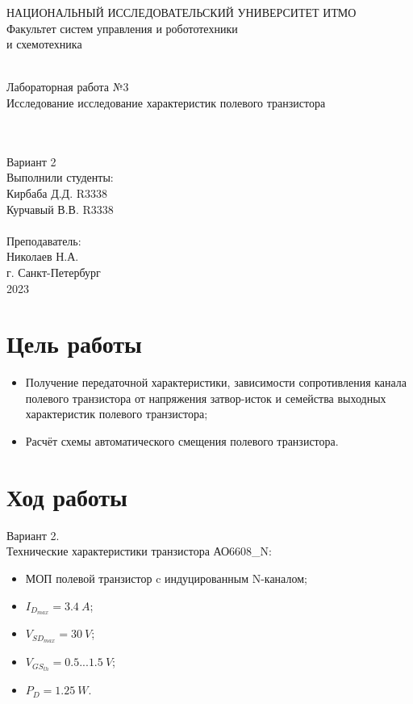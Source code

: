 \documentclass[12pt]{article}
\begin{document}
\begin{titlepage}
\begin{center}
    {\small НАЦИОНАЛЬНЫЙ ИССЛЕДОВАТЕЛЬСКИЙ УНИВЕРСИТЕТ ИТМО} \\
    {\small Факультет систем управления и робототехники} \\
    \vspace*{10\baselineskip}
    { и схемотехника} \\
    \ \\
    \begin{spacing}{1.5}
    {\large Лабораторная работа №3 \\
    Исследование исследование характеристик полевого транзистора} \\
    \end{spacing} \\
    \ \\
    Вариант 2 \\
    \vspace*{10\baselineskip}
    \hfill {Выполнили студенты:} \\
    \hfill {Кирбаба Д.Д. R3338} \\
    \hfill {Курчавый В.В. R3338} \\
    \ \\
    \hfill {Преподаватель:} \\
    \hfill {Николаев Н.А.} \\
    \mbox{}
    \vfill {г. Санкт-Петербург\\2023}
\end{center}
\end{titlepage}

\section*{Цель работы}
\begin{itemize}
  \item Получение передаточной характеристики, зависимости сопротивления канала полевого транзистора от напряжения затвор-исток и семейства выходных характеристик полевого транзистора;
  \item Расчёт схемы автоматического смещения полевого транзистора.
\end{itemize}

\section*{Ход работы}
Вариант 2.\\
Технические характеристики транзистора АО6608\_N: 
\begin{itemize}
    \item МОП полевой транзистор c индуцированным N-каналом;
    \item $I_{D_{max}} = 3.4 \ A$;
    \item $V_{SD_{max}} = 30 \ V$;
    \item $V_{GS_{th}} = 0.5 ... 1.5 \ V$;
    \item $P_D = 1.25 \ W$.
\end{itemize}
\end{document}
